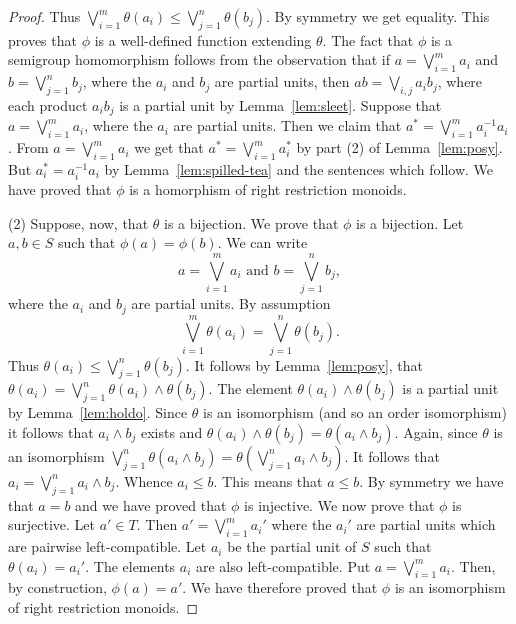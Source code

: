 \documentclass[a4paper]{amsart}
\begin{document}
\begin{proof}
Thus $\bigvee_{i=1}^{m} \theta (a_{i}) \leq  \bigvee_{j=1}^{n} \theta (b_{j})$.
By symmetry we get equality.
This proves that $\phi$ is a well-defined function extending $\theta$.
The fact that $\phi$ is a semigroup homomorphism follows from the observation that if
$a = \bigvee_{i=1}^{m} a_{i}$ and $b = \bigvee_{j=1}^{n}b_{j}$,
where the $a_{i}$ and $b_{j}$ are partial units,
then $ab = \bigvee_{i,j} a_{i}b_{j}$,
where each product $a_{i}b_{j}$ is a partial unit by Lemma~\ref{lem:sleet}.
Suppose that $a = \bigvee_{i=1}^{m}a_{i}$, where the $a_{i}$ are partial units.
Then we claim that $a^{\ast} =  \bigvee_{i=1}^{m}a_{i}^{-1}a_{i}$.
From 
$a = \bigvee_{i=1}^{m}a_{i}$
we get that
$a^{\ast} = \bigvee_{i=1}^{m}a_{i}^{\ast}$
by part (2) of Lemma~\ref{lem:posy}. 
But
$a_{i}^{\ast} = a_{i}^{-1}a_{i}$
by Lemma~\ref{lem:spilled-tea} and the sentences which follow.
We have proved that $\phi$ is a homorphism of right restriction monoids.

(2) Suppose, now, that $\theta$ is a bijection.
We prove that $\phi$ is a bijection.
Let $a,b \in S$ such that $\phi (a) = \phi(b)$.
We can write
$$a = \bigvee_{i=1}^{m} a_{i} \text{ and } b = \bigvee_{j=1}^{n} b_{j},$$
where the $a_{i}$ and $b_{j}$ are partial units.
By assumption
$$\bigvee_{i=1}^{m} \theta (a_{i}) = \bigvee_{j=1}^{n} \theta (b_{j}).$$
Thus $\theta (a_{i}) \leq  \bigvee_{j=1}^{n} \theta (b_{j})$.
It follows by Lemma~\ref{lem:posy},
that 
$\theta (a_{i}) =  \bigvee_{j=1}^{n} \theta (a_{i}) \wedge \theta (b_{j})$.
The element $\theta (a_{i}) \wedge \theta (b_{j})$ is a partial unit by Lemma~\ref{lem:holdo}.
Since $\theta$ is an isomorphism (and so an order isomorphism)
it follows that $a_{i} \wedge b_{j}$ exists and
$\theta (a_{i}) \wedge \theta (b_{j}) = \theta (a_{i} \wedge b_{j})$.
Again, since $\theta$ is an isomorphism
$\bigvee_{j=1}^{n} \theta (a_{i} \wedge b_{j}) = \theta \left(\bigvee_{j=1}^{n} a_{i} \wedge b_{j} \right)$.
It follows that $a_{i} =  \bigvee_{j=1}^{n} a_{i} \wedge b_{j}$.
Whence $a_{i} \leq b$.
This means that $a \leq b$.
By symmetry we have that $a = b$ and we have proved that $\phi$ is injective.
We now prove that $\phi$ is surjective.
Let $a' \in T$.
Then $a' = \bigvee_{i=1}^{m} a_{i}'$
where the $a_{i}'$ are partial units which are pairwise left-compatible.
Let $a_{i}$ be the partial unit of $S$ such that $\theta (a_{i}) = a_{i}'$.
The elements $a_{i}$ are also left-compatible.
Put $a = \bigvee_{i=1}^{m} a_{i}$.
Then, by construction, $\phi (a) = a'$. 
We have therefore proved that $\phi$ is an isomorphism of right restriction monoids.
\end{proof}
\end{document}
